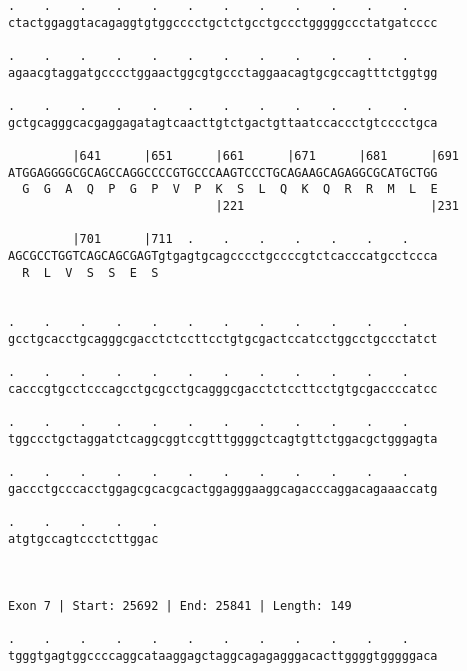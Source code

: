 \documentclass{article}
\begin{document}
\begin{Verbatim}
.    .    .    .    .    .    .    .    .    .    .    .    
ctactggaggtacagaggtgtggcccctgctctgcctgccctgggggccctatgatcccc
                                                            
.    .    .    .    .    .    .    .    .    .    .    .    
agaacgtaggatgcccctggaactggcgtgccctaggaacagtgcgccagtttctggtgg
                                                            
.    .    .    .    .    .    .    .    .    .    .    .    
gctgcagggcacgaggagatagtcaacttgtctgactgttaatccaccctgtcccctgca
                                                            
         |641      |651      |661      |671      |681      |691
ATGGAGGGGCGCAGCCAGGCCCCGTGCCCAAGTCCCTGCAGAAGCAGAGGCGCATGCTGG
  G  G  A  Q  P  G  P  V  P  K  S  L  Q  K  Q  R  R  M  L  E
                             |221                          |231
  
         |701      |711  .    .    .    .    .    .    .    
AGCGCCTGGTCAGCAGCGAGTgtgagtgcagcccctgccccgtctcacccatgcctccca
  R  L  V  S  S  E  S                                       
                                                            
  
.    .    .    .    .    .    .    .    .    .    .    .    
gcctgcacctgcagggcgacctctccttcctgtgcgactccatcctggcctgccctatct
                                                            
.    .    .    .    .    .    .    .    .    .    .    .    
cacccgtgcctcccagcctgcgcctgcagggcgacctctccttcctgtgcgaccccatcc
                                                            
.    .    .    .    .    .    .    .    .    .    .    .    
tggccctgctaggatctcaggcggtccgtttggggctcagtgttctggacgctgggagta
                                                            
.    .    .    .    .    .    .    .    .    .    .    .    
gaccctgcccacctggagcgcacgcactggagggaaggcagacccaggacagaaaccatg
                                                            
.    .    .    .    .
atgtgccagtccctcttggac
                     
                     
 
Exon 7 | Start: 25692 | End: 25841 | Length: 149
 
.    .    .    .    .    .    .    .    .    .    .    .    
tgggtgagtggccccaggcataaggagctaggcagagagggacacttggggtgggggaca
                                                            

\end{Verbatim}
\end{document}

